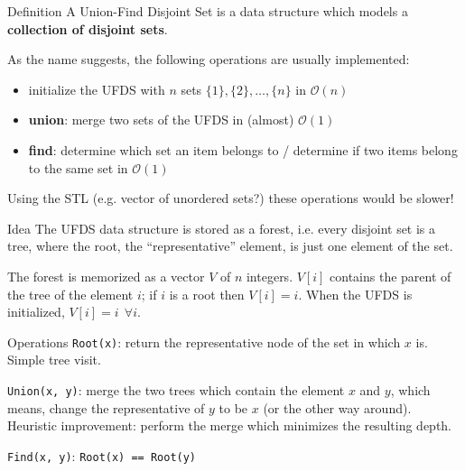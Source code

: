 \documentclass[compress]{beamer}
\begin{document}
\begin{frame}{Definition}
    A Union-Find Disjoint Set is a data structure which models a \textbf{collection of disjoint sets}.

    As the name suggests, the following operations are usually implemented:
    \begin{itemize}
        \item initialize the UFDS with $n$ sets $\lbrace 1 \rbrace, \lbrace 2 \rbrace, \dots, \lbrace n \rbrace$ in $\mathcal{O}(n)$\pause
        \item \textbf{union}: merge two sets of the UFDS in (almost) $\mathcal{O}(1)$\pause
        \item \textbf{find}: determine which set an item belongs to / determine if two items belong to the same set in $\mathcal{O}(1)$
    \end{itemize}
    \bigskip

    Using the STL (e.g. vector of unordered sets?) these operations would be slower!    
\end{frame}

\begin{frame}{Idea}
    The UFDS data structure is stored as a forest, i.e. every disjoint set is a tree, where the root, the \enquote{representative} element, is just one element of the set.

    The forest is memorized as a vector $V$ of $n$ integers. $V[i]$ contains the parent of the tree of the element $i$; if $i$ is a root then $V[i] = i$. When the UFDS is initialized, $V[i] = i~~\forall i$.

    \begin{figure}
        
    \end{figure}
\end{frame}

\begin{frame}{Operations}
    \texttt{Root(x)}: return the representative node of the set in which $x$ is. Simple tree visit. \pause

    \bigskip
    \texttt{Union(x, y)}: merge the two trees which contain the element $x$ and $y$, which means, change the representative of $y$ to be $x$ (or the other way around). Heuristic improvement: perform the merge which minimizes the resulting depth.\pause

    \bigskip
    \texttt{Find(x, y)}: \texttt{Root(x) == Root(y)}
    
\end{frame}
\end{document}
